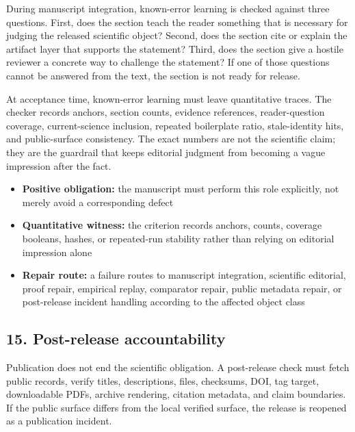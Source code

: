 During manuscript integration, known-error learning is checked against three questions. First, does the section teach the reader something that is necessary for judging the released scientific object? Second, does the section cite or explain the artifact layer that supports the statement? Third, does the section give a hostile reviewer a concrete way to challenge the statement? If one of those questions cannot be answered from the text, the section is not ready for release.


At acceptance time, known-error learning must leave quantitative traces. The checker records anchors, section counts, evidence references, reader-question coverage, current-science inclusion, repeated boilerplate ratio, stale-identity hits, and public-surface consistency. The exact numbers are not the scientific claim; they are the guardrail that keeps editorial judgment from becoming a vague impression after the fact.


\begin{itemize}[leftmargin=1.8em]

\item \textbf{Positive obligation:} the manuscript must perform this role explicitly, not merely avoid a corresponding defect

\item \textbf{Quantitative witness:} the criterion records anchors, counts, coverage booleans, hashes, or repeated-run stability rather than relying on editorial impression alone

\item \textbf{Repair route:} a failure routes to manuscript integration, scientific editorial, proof repair, empirical replay, comparator repair, public metadata repair, or post-release incident handling according to the affected object class

\end{itemize}

\subsection{15. Post-release accountability}

Publication does not end the scientific obligation. A post-release check must fetch public records, verify titles, descriptions, files, checksums, DOI, tag target, downloadable PDFs, archive rendering, citation metadata, and claim boundaries. If the public surface differs from the local verified surface, the release is reopened as a publication incident.



